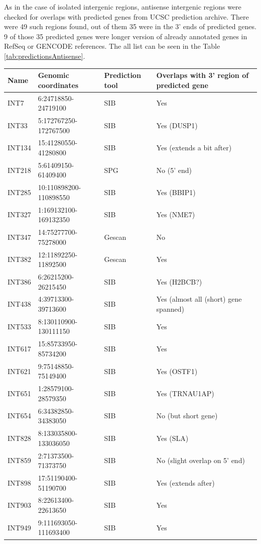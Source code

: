 As in the case of isolated intergenic regions,
antisense intergenic regions were checked for overlaps with predicted genes from UCSC prediction archive.
There were 49 such regions found, out of them 35 were in the 3' ends of predicted genes.
9 of those 35 predicted genes were longer version of already annotated genes in RefSeq or GENCODE references.
The all list can be seen in the Table \ref{tab:predictionsAntisense}.

\begin{table}[h]
    \small
    \centering
    \begin{tabular}{llll}
        \toprule
        Name & Genomic coordinates & Prediction tool & Overlaps with 3' region of predicted gene \\
        \midrule
	INT7 & 6:24718850-24719100 & SIB & Yes \\
	INT33 & 5:172767250-172767500 & SIB & Yes (DUSP1) \\
	INT134 & 15:41280550-41280800 & SIB & Yes (extends a bit after) \\
	INT218 & 5:61409150-61409400 & SPG & No (5' end) \\
	INT285 & 10:110898200-110898550 & SIB & Yes (BBIP1) \\
	INT327 & 1:169132100-169132350 & SIB & Yes (NME7) \\
	INT347 & 14:75277700-75278000 & Gescan & No \\
	INT382 & 12:11892250-11892500 & Gescan & Yes \\
	INT386 & 6:26215200-26215450 & SIB & Yes (H2BCB?) \\
	INT438 & 4:39713300-39713600 & SIB & Yes (almost all (short) gene spanned) \\
	INT533 & 8:130110900-130111150 & SIB & Yes \\
	INT617 & 15:85733950-85734200 & SIB & Yes \\
	INT621 & 9:75148850-75149400 & SIB & Yes (OSTF1) \\
	INT651 & 1:28579100-28579350 & SIB & Yes (TRNAU1AP) \\
	INT654 & 6:34382850-34383050 & SIB & No (but short gene)\\
	INT828 & 8:133035800-133036050 & SIB & Yes (SLA) \\
	INT859 & 2:71373500-71373750 & SIB & No (slight overlap on 5' end) \\
	INT898 & 17:51190400-51190700 & SIB & Yes (extends after)\\
	INT903 & 8:22613400-22613650 & SIB & Yes \\
	INT949 & 9:111693050-111693400 & SIB & Yes \\

\end{tabular}
\end{table}
